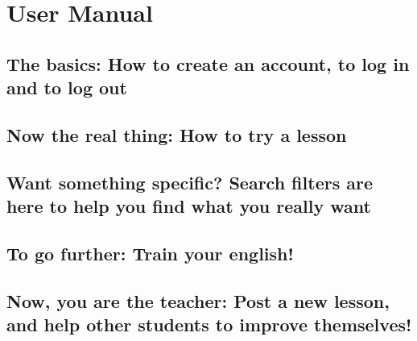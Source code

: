 \section{User Manual}

\subsection{The basics: How to create an account, to log in and to log out}


\subsection{Now the real thing: How to try a lesson}

\subsection{Want something specific? Search filters are here to help you find what you really want}


\subsection{To go further: Train your english!}

\subsection{Now, you are the teacher: Post a new lesson, and help other students to improve themselves!}


